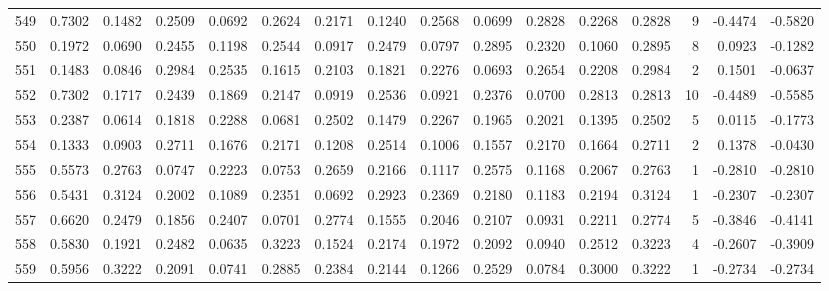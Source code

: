 \begin{tabular}{lrrrrrrrrrrrrrrr}
549 &      0.7302 &  0.1482 &  0.2509 &  0.0692 &  0.2624 &  0.2171 &  0.1240 &  0.2568 &  0.0699 &  0.2828 &   0.2268 &     0.2828 &      9 &                   -0.4474 &                    -0.5820 \\
550 &      0.1972 &  0.0690 &  0.2455 &  0.1198 &  0.2544 &  0.0917 &  0.2479 &  0.0797 &  0.2895 &  0.2320 &   0.1060 &     0.2895 &      8 &                    0.0923 &                    -0.1282 \\
551 &      0.1483 &  0.0846 &  0.2984 &  0.2535 &  0.1615 &  0.2103 &  0.1821 &  0.2276 &  0.0693 &  0.2654 &   0.2208 &     0.2984 &      2 &                    0.1501 &                    -0.0637 \\
552 &      0.7302 &  0.1717 &  0.2439 &  0.1869 &  0.2147 &  0.0919 &  0.2536 &  0.0921 &  0.2376 &  0.0700 &   0.2813 &     0.2813 &     10 &                   -0.4489 &                    -0.5585 \\
553 &      0.2387 &  0.0614 &  0.1818 &  0.2288 &  0.0681 &  0.2502 &  0.1479 &  0.2267 &  0.1965 &  0.2021 &   0.1395 &     0.2502 &      5 &                    0.0115 &                    -0.1773 \\
554 &      0.1333 &  0.0903 &  0.2711 &  0.1676 &  0.2171 &  0.1208 &  0.2514 &  0.1006 &  0.1557 &  0.2170 &   0.1664 &     0.2711 &      2 &                    0.1378 &                    -0.0430 \\
555 &      0.5573 &  0.2763 &  0.0747 &  0.2223 &  0.0753 &  0.2659 &  0.2166 &  0.1117 &  0.2575 &  0.1168 &   0.2067 &     0.2763 &      1 &                   -0.2810 &                    -0.2810 \\
556 &      0.5431 &  0.3124 &  0.2002 &  0.1089 &  0.2351 &  0.0692 &  0.2923 &  0.2369 &  0.2180 &  0.1183 &   0.2194 &     0.3124 &      1 &                   -0.2307 &                    -0.2307 \\
557 &      0.6620 &  0.2479 &  0.1856 &  0.2407 &  0.0701 &  0.2774 &  0.1555 &  0.2046 &  0.2107 &  0.0931 &   0.2211 &     0.2774 &      5 &                   -0.3846 &                    -0.4141 \\
558 &      0.5830 &  0.1921 &  0.2482 &  0.0635 &  0.3223 &  0.1524 &  0.2174 &  0.1972 &  0.2092 &  0.0940 &   0.2512 &     0.3223 &      4 &                   -0.2607 &                    -0.3909 \\
559 &      0.5956 &  0.3222 &  0.2091 &  0.0741 &  0.2885 &  0.2384 &  0.2144 &  0.1266 &  0.2529 &  0.0784 &   0.3000 &     0.3222 &      1 &                   -0.2734 &                    -0.2734 \\

\end{tabular}
